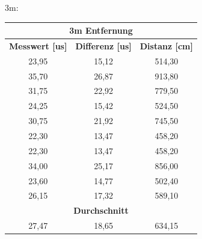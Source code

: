 3m:
\begin{table}[H]
\begin{tabular}{|c|c|c|}
\hline
\multicolumn{3}{|c|}{\textbf{3m Entfernung}}                                         \\ \hline
\textbf{Messwert {[}us{]}} & \textbf{Differenz {[}us{]}} & \textbf{Distanz {[}cm{]}} \\ \hline
23,95                      & 15,12                       & 514,30                    \\ \hline
35,70                      & 26,87                       & 913,80                    \\ \hline
31,75                      & 22,92                       & 779,50                    \\ \hline
24,25                      & 15,42                       & 524,50                    \\ \hline
30,75                      & 21,92                       & 745,50                    \\ \hline
22,30                      & 13,47                       & 458,20                    \\ \hline
22,30                      & 13,47                       & 458,20                    \\ \hline
34,00                      & 25,17                       & 856,00                    \\ \hline
23,60                      & 14,77                       & 502,40                    \\ \hline
26,15                      & 17,32                       & 589,10                    \\ \hline
\multicolumn{3}{|c|}{\textbf{Durchschnitt}}                                          \\ \hline
27,47                      & 18,65                       & 634,15                    \\ \hline
\end{tabular}
\end{table}



